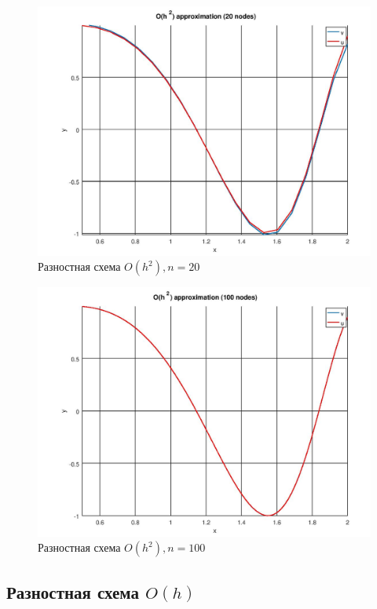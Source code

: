 \documentclass[12pt]{article}
\begin{document}
\begin{figure}
\begin{center}
\includegraphics[scale = 0.65]{h2_20.jpg} 
\end{center}
\caption{Разностная схема $O(h^2), n = 20$ }
\end{figure}

\begin{figure}
\begin{center}
\includegraphics[scale = 0.65]{h2_100.jpg} 
\end{center}
\caption{Разностная схема $O(h^2), n = 100$ }
\end{figure}

\subsection{Разностная схема $O(h)$}
\end{document}
